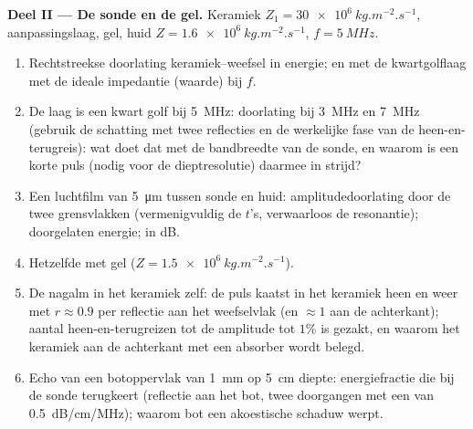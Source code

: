 \begin{problem}
\medskip
\noindent\textbf{Deel II --- De sonde en de gel.}
Keramiek $Z_1 = \qty{30e6}{kg.m^{-2}.s^{-1}}$, aanpassingslaag, gel, huid
$Z =
\qty{1.6e6}{kg.m^{-2}.s^{-1}}$, $f = \qty{5}{MHz}$.
\begin{enumerate}[resume]
  \item Rechtstreekse doorlating keramiek--weefsel in energie; en met de
        kwartgolflaag met de ideale impedantie (waarde) bij $f$.
  \item De laag is een kwart golf bij \qty{5}{MHz}: doorlating bij
        \qty{3}{MHz} en \qty{7}{MHz} (gebruik de schatting met twee
        reflecties en de werkelijke fase van de heen-en-terugreis): wat doet
        dat met de bandbreedte van de sonde, en waarom is een korte puls
        (nodig voor de dieptresolutie) daarmee in strijd?
  \item Een luchtfilm van \qty{5}{\micro m} tussen sonde en huid:
        amplitudedoorlating door de twee grensvlakken (vermenigvuldig de
        $t$'s, verwaarloos de resonantie); doorgelaten energie; in dB.
  \item Hetzelfde met gel ($Z = \qty{1.5e6}{kg.m^{-2}.s^{-1}}$).
  \item De nagalm in het keramiek zelf: de puls kaatst in het keramiek heen
        en weer met $r \approx 0.9$ per reflectie aan het weefselvlak (en
        $\approx 1$ aan de achterkant); aantal heen-en-terugreizen tot de
        amplitude tot $1\%$ is gezakt, en waarom het keramiek aan de
        achterkant met een absorber wordt belegd.
  \item Echo van een botoppervlak van \qty{1}{mm} op \qty{5}{cm} diepte:
        energiefractie die bij de sonde terugkeert (reflectie aan het bot,
        twee doorgangen met een  van \qty{0.5}{dB/cm/MHz});
        waarom bot een akoestische schaduw werpt.
\end{enumerate}


\end{problem}
